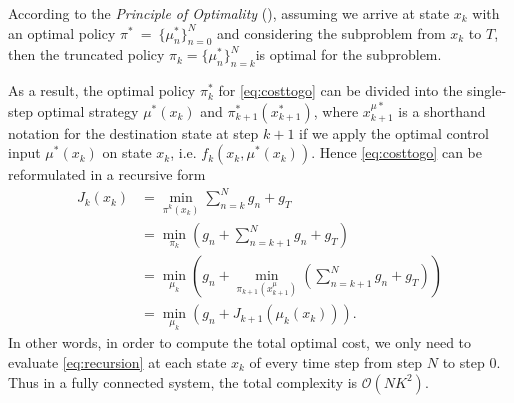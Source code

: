 According to the \textit{Principle of Optimality} (\cite{bellman1954theory}), assuming we arrive at state $ x_k $ with an optimal policy $\pi^*~=~\lbrace\mu^*_n\rbrace_{n=0}^N$ and considering the subproblem from $ x_k $ to $ T $, then the truncated policy $ \pi_k = \lbrace\mu^*_n\rbrace_{n=k}^N $is optimal for the subproblem. 

As a result, the optimal policy $\pi^*_{k}$ for \autoref{eq:costtogo} can be divided into the single-step optimal strategy $ \mu^*(x_{k}) $ and $ \pi^*_{k+1}\left(x_{k+1}^*\right) $, where $ x_{k+1}^{\mu*} $ is a shorthand notation for the destination state at step $ k+1 $ if we apply the optimal control input $ \mu^*\left(x_{k}\right) $ on state $ x_{k} $, i.e. $ f_{k}\left(x_{k}, \mu^*\left(x_{k}\right)\right) $. 
Hence \autoref{eq:costtogo} can be reformulated in a recursive form
\begin{align}
J_{k}(x_{k}) &= \min_{\pi^k\left(x_{k}\right)}\sum_{n=k}^{N}g_n + g_{T}\nonumber\\
&= \min_{\pi_k}\left(g_n + \sum_{n=k+1}^{N}g_n + g_{T} \right)\nonumber\\
&= \min_{\mu_k}\left(g_n + \min_{\pi_{k+1}\left(x_{k+1}^\mu\right)}\left(\sum_{n=k+1}^{N}g_n + g_{T}\right)\right)\nonumber\\
&= \min_{\mu_k}\left(g_n + J_{k+1}\left(\mu_{k}(x_{k})\right)\right). \label{eq:recursion}
\end{align}
In other words, in order to compute the total optimal cost, we only need to evaluate \autoref{eq:recursion} at each state $  x_{k}$ of every time step from step $ N $ to step $ 0 $. 
Thus in a fully connected system, the total complexity is $ \mathcal{O}\left(NK^2\right) $.

